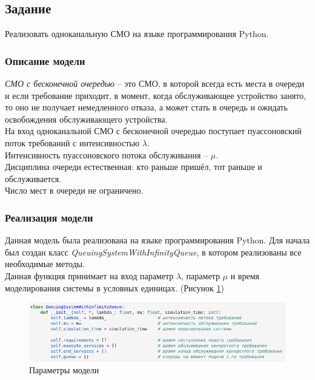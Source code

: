 \documentclass[14pt,fleqn]{extarticle}
\begin{document}
    \subsection*{Задание}
	Реализовать одноканальную СМО на языке программирования Python.

	\subsubsection*{Описание модели}
	\textit{СМО с бесконечной очередью} -- это СМО, в которой всегда есть места в очереди и если требование приходит, в момент, когда обслуживающее устройство занято, то оно не получает немедленного отказа, а может стать в очередь и ожидать освобождения обслуживающего устройства.\\
	
	На вход одноканальной СМО с бесконечной очередью поступает пуассоновский поток требований с интенсивностью $\lambda$.\\
	Интенсивность пуассоновского потока обслуживания -- $\mu$.\\
	Дисциплина очереди естественная: кто раньше пришёл, тот раньше и обслуживается.\\
	Число мест в очереди не ограничено.
	
	\subsubsection*{Реализация модели}
	Данная модель была реализована на языке программирования Python. Для начала был создан класс \textit{QueuingSystemWithInfinityQueue}, в котором реализованы все необходимые методы.\\
	
	Данная функция принимает на вход параметр $\lambda$, параметр $\mu$ и время моделирования системы в условных единицах. (Рисунок \ref{fig:queuing_system_with_infinity_queue_params})
	\begin{figure}[h]
		\centering \includegraphics[scale=0.62]{queuing_system_with_infinity_queue_params}
		\caption{Параметры модели}
		\label{fig:queuing_system_with_infinity_queue_params}
	\end{figure}
	
\end{document}
